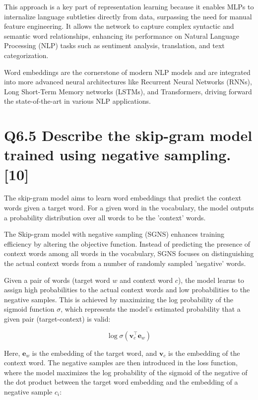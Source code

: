 \documentclass[11pt]{article}
\begin{document}
This approach is a key part of representation learning because it enables MLPs to internalize language subtleties directly from data, surpassing the need for manual feature engineering. It allows the network to capture complex syntactic and semantic word relationships, enhancing its performance on Natural Language Processing (NLP) tasks such as sentiment analysis, translation, and text categorization.

Word embeddings are the cornerstone of modern NLP models and are integrated into more advanced neural architectures like Recurrent Neural Networks (RNNs), Long Short-Term Memory networks (LSTMs), and Transformers, driving forward the state-of-the-art in various NLP applications.


\section{Q6.5 Describe the skip-gram model trained using negative sampling. [10]}

The skip-gram model aims to learn word embeddings that predict the context words given a target word. For a given word in the vocabulary, the model outputs a probability distribution over all words to be the 'context' words.

The Skip-gram model with negative sampling (SGNS) enhances training efficiency by altering the objective function. Instead of predicting the presence of context words among all words in the vocabulary, SGNS focuses on distinguishing the actual context words from a number of randomly sampled 'negative' words.

Given a pair of words (target word $w$ and context word $c$), the model learns to assign high probabilities to the actual context words and low probabilities to the negative samples. This is achieved by maximizing the log probability of the sigmoid function $\sigma$, which represents the model's estimated probability that a given pair (target-context) is valid:

\begin{equation}
    \log \sigma(\mathbf{v}_c^\top \mathbf{e}_w)
\end{equation}

Here, $\mathbf{e}_w$ is the embedding of the target word, and $\mathbf{v}_c$ is the embedding of the context word. The negative samples are then introduced in the loss function, where the model maximizes the log probability of the sigmoid of the negative of the dot product between the target word embedding and the embedding of a negative sample $c_i$:
\end{document}
